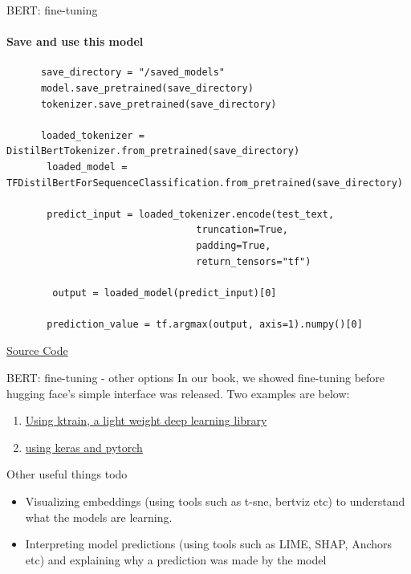 \documentclass{beamer}
\begin{document}
\begin{frame}[fragile]{BERT: fine-tuning}
\framesubtitle{Save and use this model}
    \tiny
    \begin{verbatim}
      save_directory = "/saved_models"
      model.save_pretrained(save_directory)
      tokenizer.save_pretrained(save_directory) 
      
      loaded_tokenizer = DistilBertTokenizer.from_pretrained(save_directory)
       loaded_model = TFDistilBertForSequenceClassification.from_pretrained(save_directory)
       
       predict_input = loaded_tokenizer.encode(test_text,
                                 truncation=True,
                                 padding=True,
                                 return_tensors="tf")

        output = loaded_model(predict_input)[0]

       prediction_value = tf.argmax(output, axis=1).numpy()[0]
    \end{verbatim}
    \href{https://www.sunnyville.ai/fine-tuning-distilbert-multi-class-text-classification-using-transformers-and-tensorflow/}{Source Code}
\end{frame}

\begin{frame}{BERT: fine-tuning - other options}
    In our book, we showed fine-tuning before hugging face's simple interface was released. Two examples are below:
    \begin{enumerate}
        \item \href{https://github.com/practical-nlp/practical-nlp/blob/master/Ch4/07_BERT_Sentiment_Classification_IMDB_ktrain.ipynb}{Using ktrain, a light weight deep learning library}
        \item \href{https://github.com/practical-nlp/practical-nlp/blob/master/Ch4/06_BERT_IMDB_Sentiment_Classification.ipynb}{using keras and pytorch}
    \end{enumerate}
\end{frame}

\begin{frame}{Other useful things todo}
    \begin{itemize}
        \item Visualizing embeddings (using tools such as t-sne, bertviz etc) to understand what the models are learning.
        \item Interpreting model predictions (using tools such as LIME, SHAP, Anchors etc) and explaining why a prediction was made by the model
    \end{itemize}
\end{frame}
\end{document}
